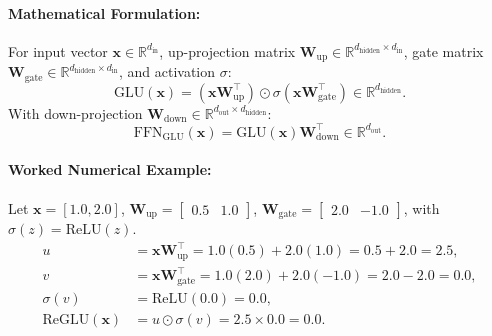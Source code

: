 \documentclass[11pt]{article}
\begin{document}
\paragraph{Mathematical Formulation:}
For input vector $\mathbf{x} \in \mathbb{R}^{d_{\text{in}}}$, up-projection matrix $\mathbf{W}_{\text{up}} \in \mathbb{R}^{d_{\text{hidden}} \times d_{\text{in}}}$, gate matrix $\mathbf{W}_{\text{gate}} \in \mathbb{R}^{d_{\text{hidden}} \times d_{\text{in}}}$, and activation $\sigma$:
\begin{equation}
\label{eq:glu_def}
\text{GLU}(\mathbf{x}) = (\mathbf{x} \mathbf{W}_{\text{up}}^\top) \odot \sigma(\mathbf{x} \mathbf{W}_{\text{gate}}^\top) \in \mathbb{R}^{d_{\text{hidden}}}.
\end{equation}
With down-projection $\mathbf{W}_{\text{down}} \in \mathbb{R}^{d_{\text{out}} \times d_{\text{hidden}}}$:
\begin{equation}
\label{eq:glu_ffn}
\text{FFN}_{\text{GLU}}(\mathbf{x}) = \text{GLU}(\mathbf{x}) \mathbf{W}_{\text{down}}^\top \in \mathbb{R}^{d_{\text{out}}}.
\end{equation}

\paragraph{Worked Numerical Example:}
Let $\mathbf{x} = [1.0, 2.0]$, $\mathbf{W}_{\text{up}} = \begin{bmatrix} 0.5 & 1.0 \end{bmatrix}$, $\mathbf{W}_{\text{gate}} = \begin{bmatrix} 2.0 & -1.0 \end{bmatrix}$, with $\sigma(z) = \text{ReLU}(z)$.
\begin{align}
u &= \mathbf{x} \mathbf{W}_{\text{up}}^\top = 1.0(0.5) + 2.0(1.0) = 0.5 + 2.0 = 2.5, \\
v &= \mathbf{x} \mathbf{W}_{\text{gate}}^\top = 1.0(2.0) + 2.0(-1.0) = 2.0 - 2.0 = 0.0, \\
\sigma(v) &= \text{ReLU}(0.0) = 0.0, \\
\text{ReGLU}(\mathbf{x}) &= u \odot \sigma(v) = 2.5 \times 0.0 = 0.0.
\end{align}
\end{document}

